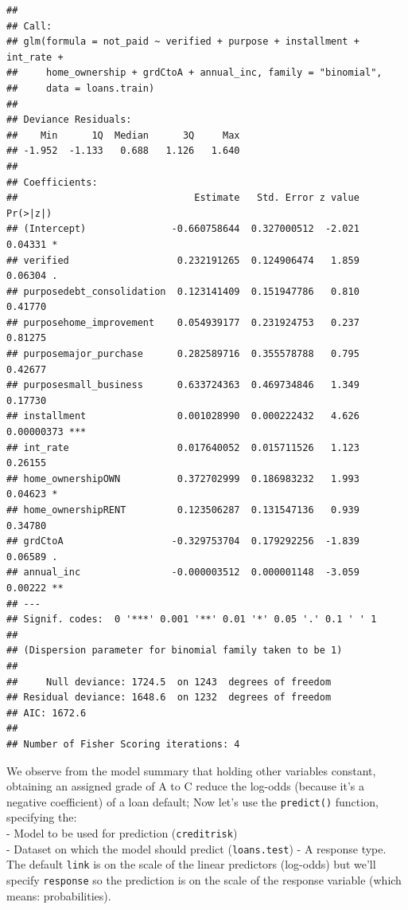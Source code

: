 \documentclass[
]{article}
\newenvironment{Shaded}{\begin{snugshade}}{\end{snugshade}}
\newcommand{\AttributeTok}[1]{\textcolor[rgb]{0.77,0.63,0.00}{#1}}
\newcommand{\FunctionTok}[1]{\textcolor[rgb]{0.00,0.00,0.00}{#1}}
\newcommand{\NormalTok}[1]{#1}
\newcommand{\OtherTok}[1]{\textcolor[rgb]{0.56,0.35,0.01}{#1}}
\newcommand{\SpecialCharTok}[1]{\textcolor[rgb]{0.00,0.00,0.00}{#1}}
\newcommand{\StringTok}[1]{\textcolor[rgb]{0.31,0.60,0.02}{#1}}
\begin{document}
\begin{verbatim}
## 
## Call:
## glm(formula = not_paid ~ verified + purpose + installment + int_rate + 
##     home_ownership + grdCtoA + annual_inc, family = "binomial", 
##     data = loans.train)
## 
## Deviance Residuals: 
##    Min      1Q  Median      3Q     Max  
## -1.952  -1.133   0.688   1.126   1.640  
## 
## Coefficients:
##                               Estimate   Std. Error z value   Pr(>|z|)    
## (Intercept)               -0.660758644  0.327000512  -2.021    0.04331 *  
## verified                   0.232191265  0.124906474   1.859    0.06304 .  
## purposedebt_consolidation  0.123141409  0.151947786   0.810    0.41770    
## purposehome_improvement    0.054939177  0.231924753   0.237    0.81275    
## purposemajor_purchase      0.282589716  0.355578788   0.795    0.42677    
## purposesmall_business      0.633724363  0.469734846   1.349    0.17730    
## installment                0.001028990  0.000222432   4.626 0.00000373 ***
## int_rate                   0.017640052  0.015711526   1.123    0.26155    
## home_ownershipOWN          0.372702999  0.186983232   1.993    0.04623 *  
## home_ownershipRENT         0.123506287  0.131547136   0.939    0.34780    
## grdCtoA                   -0.329753704  0.179292256  -1.839    0.06589 .  
## annual_inc                -0.000003512  0.000001148  -3.059    0.00222 ** 
## ---
## Signif. codes:  0 '***' 0.001 '**' 0.01 '*' 0.05 '.' 0.1 ' ' 1
## 
## (Dispersion parameter for binomial family taken to be 1)
## 
##     Null deviance: 1724.5  on 1243  degrees of freedom
## Residual deviance: 1648.6  on 1232  degrees of freedom
## AIC: 1672.6
## 
## Number of Fisher Scoring iterations: 4
\end{verbatim}

We observe from the model summary that holding other variables constant,
obtaining an assigned grade of A to C reduce the log-odds (because it's
a negative coefficient) of a loan default; Now let's use the
\texttt{predict()} function, specifying the:\\
- Model to be used for prediction (\texttt{creditrisk})\\
- Dataset on which the model should predict (\texttt{loans.test}) - A
response type. The default \texttt{link} is on the scale of the linear
predictors (log-odds) but we'll specify \texttt{response} so the
prediction is on the scale of the response variable (which means:
probabilities).

\begin{Shaded}
\end{Shaded}
\end{document}
